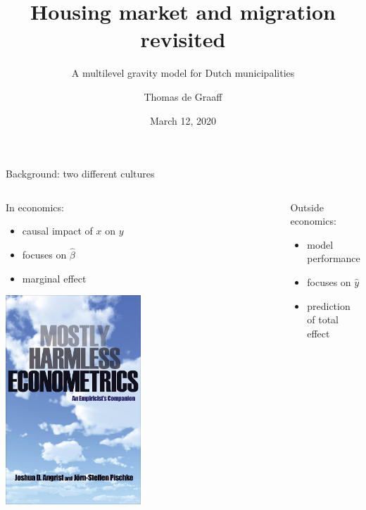 \documentclass{beamer}
\title{Housing market and migration revisited}
\subtitle{A multilevel gravity model for Dutch municipalities}
\date{March 12, 2020}
\author{Thomas de Graaff}
\institute{Vrije Universiteit Amsterdam\\Tinbergen Institute Amsterdam}
\begin{document}
\maketitle

\begin{frame}{Background: two different cultures \footnotesize{\citep{breiman2001statistical}} }
\begin{columns}
	\begin{column}{0.5\textwidth}
		In economics: 
		\begin{itemize}
			\item \alert{causal} impact of $x$ on $y$
			\item \alert{focuses} on $\hat{\beta}$
			\item \alert{marginal} effect
		\end{itemize}
		\begin{center}
			\includegraphics[width=0.5\textwidth]{../fig/harmless}      
		\end{center}
	\end{column}\pause
	\begin{column}{0.5\textwidth} 
		Outside economics: 
		\begin{itemize}
			\item \alert{model performance } 
			\item \alert{focuses} on $\hat{y}$
			\item \alert{prediction} of total effect
		\end{itemize}
		\begin{center}

\end{center}
\end{column}
\end{columns}
\end{frame}
\end{document}
